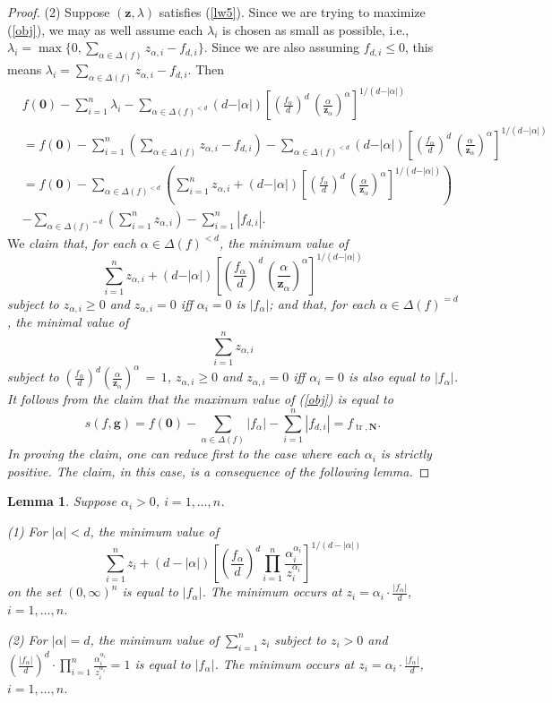 \documentclass{amsart}
\newtheorem{lemma}[thm]{Lemma}
\theoremstyle{definition}
\begin{document}
\begin{proof}
(2) Suppose $(\mathbf{z},\lambda)$ satisfies (\ref{lw5}). Since we are trying to maximize (\ref{obj}), we may as well assume each
$\lambda_i$ is chosen as small as possible, i.e., $\lambda_i = \max\{ 0, \sum_{\alpha\in \Delta(f)} z_{\alpha,i}-f_{d,i}\}$.
Since we are also assuming $f_{d,i}\le 0$, this means $\lambda_i = \sum_{\alpha\in \Delta(f)} z_{\alpha,i}-f_{d,i}$. Then
\begin{align*}
&f(\mathbf{0})-\sum_{i=1}^n \lambda_i- \sum_{\alpha\in\Delta(f)^{<d}} (d-\vert\alpha\vert)\left[
\left(\frac{f_\alpha}{d}\right)^{d}\,\left(\frac{\alpha}{\mathbf{z}_\alpha}\right)^\alpha
\right]^{1/(d-\vert\alpha\vert)}\\
&=f(\mathbf{0})-\sum_{i=1}^n(\sum_{\alpha\in \Delta(f)}z_{\alpha,i}-f_{d,i})- \sum_{\alpha\in\Delta(f)^{<d}} (d-\vert\alpha\vert)\left[
\left(\frac{f_\alpha}{d}\right)^{d}\,\left(\frac{\alpha}{\mathbf{z}_\alpha}\right)^\alpha
\right]^{1/(d-\vert\alpha\vert)}\\
&=f(\mathbf{0})-\sum_{\alpha\in \Delta(f)^{<d}}(\sum_{i=1}^n z_{\alpha,i}+(d-\vert\alpha\vert)\left[
\left(\frac{f_\alpha}{d}\right)^{d}\,\left(\frac{\alpha}{\mathbf{z}_\alpha}\right)^\alpha
\right]^{1/(d-\vert\alpha\vert)})\\
&-\sum_{\alpha\in \Delta(f)^{=d}}(\sum_{i=1}^n z_{\alpha,i})-\sum_{i=1}^n |f_{d,i}|.
\end{align*}
%
We \it claim \rm that, for each $\alpha \in \Delta(f)^{<d}$, the minimum value of
\[
	\sum_{i=1}^n z_{\alpha,i}+(d-\vert\alpha\vert)\left[
	 \left(\frac{f_\alpha}{d}\right)^{d}\,\left(\frac{\alpha}{\mathbf{z}_\alpha}\right)^\alpha
	\right]^{1/(d-\vert\alpha\vert)}
\]
subject to $z_{\alpha,i}\ge 0$ and $z_{\alpha,i}=0$ iff $\alpha_i=0$ is $|f_{\alpha}|$; and that, for each
$\alpha \in \Delta(f)^{=d}$, the minimal value of
\[
	\sum_{i=1}^n z_{\alpha,i}
\]
subject to $\left(\frac{f_\alpha}{d}\right)^{d}\left(\frac{\alpha}{\mathbf{z}_\alpha}\right)^\alpha \, = \, 1$,
$z_{\alpha,i}\ge 0$ and $z_{\alpha,i}=0$ iff $\alpha_i=0$ is also equal to $|f_{\alpha}|$.
It follows from the claim that the maximum value of (\ref{obj}) is equal to
\[
	s(f,\mathbf{g}) = f(\mathbf{0})-\sum_{\alpha\in \Delta(f)}|f_{\alpha}|-\sum_{i=1}^n |f_{d,i}| = f_{\operatorname{tr},\mathbf{N}}.
\]
In proving the claim, one can reduce first to the case where each $\alpha_i$ is strictly positive. The claim, in this case,
is a consequence of the following lemma.
\end{proof}
%
\begin{lemma}
Suppose $\alpha_i>0$, $i=1,\dots,n$.

(1) For $|\alpha|<d$, the minimum value of
\[
	\sum_{i=1}^n z_i + (d-|\alpha|)\left[(\frac{f_{\alpha}}{d})^d\prod_{i=1}^n \frac{\alpha_i^{\alpha_i}}{z_i^{\alpha_i}}\right]^{1/(d-|\alpha|)}
\]
on the set $(0,\infty)^n$ is equal to $|f_{\alpha}|$. The minimum occurs at $z_i = \alpha_i\cdot \frac{|f_{\alpha}|}{d}$, $i=1,\dots,n$.

(2) For $|\alpha|=d$, the minimum value of $\sum_{i=1}^n z_i$ subject to $z_i>0$ and
$(\frac{|f_{\alpha}|}{d})^d\cdot \prod_{i=1}^n\frac{\alpha_i^{\alpha_i}}{z_i^{\alpha_i}} = 1$ is equal to $|f_{\alpha}|$.
The minimum occurs at $z_i = \alpha_i\cdot \frac{|f_{\alpha}|}{d}$, $i=1,\dots,n$.
\end{lemma}
\end{document}
